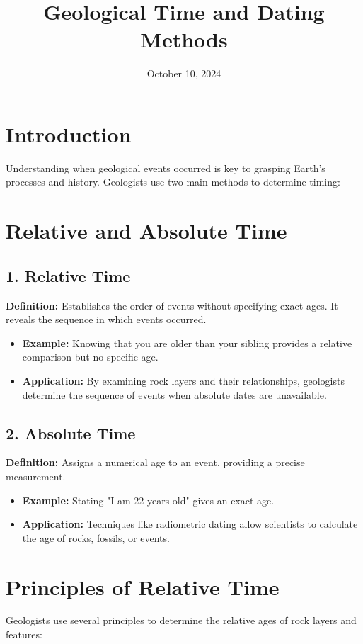 \documentclass[12pt]{article}
\title{Geological Time and Dating Methods}
\author{}
\date{October 10, 2024}
\begin{document}
\maketitle

\section*{Introduction}
Understanding when geological events occurred is key to grasping Earth's processes and history. Geologists use two main methods to determine timing:

\section*{Relative and Absolute Time}
\subsection*{1. Relative Time}
\textbf{Definition:} Establishes the order of events without specifying exact ages. It reveals the sequence in which events occurred.

\begin{itemize}
    \item \textbf{Example:} Knowing that you are older than your sibling provides a relative comparison but no specific age.
    \item \textbf{Application:} By examining rock layers and their relationships, geologists determine the sequence of events when absolute dates are unavailable.
\end{itemize}

\subsection*{2. Absolute Time}
\textbf{Definition:} Assigns a numerical age to an event, providing a precise measurement.

\begin{itemize}
    \item \textbf{Example:} Stating "I am 22 years old" gives an exact age.
    \item \textbf{Application:} Techniques like radiometric dating allow scientists to calculate the age of rocks, fossils, or events.
\end{itemize}

\section*{Principles of Relative Time}
Geologists use several principles to determine the relative ages of rock layers and features:
\end{document}

